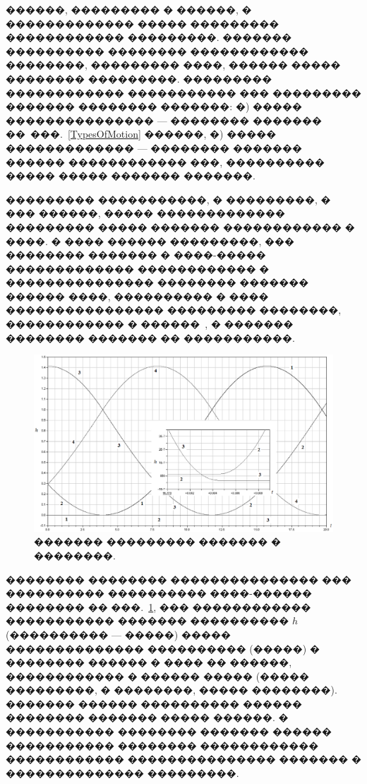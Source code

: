 \documentclass[12pt,a4paper]{article}
\begin{document}
������, ��������� � ������, � ������������� ����� ��������� ������������ 
���������. ������� ���������� �������� ������������ ��������, ��������� ����,
������ ����� �������� ���������. ��������� ������������ ����������� ��� 
��������� ������� �������� �������: �) ����� ��������������� --- �������� 
������� ��~���.~\ref{TypesOfMotion} ������, �) ����� ������������� --- �������� 
������� ������ ������������ ���, ���������� ����� ����� ������� �������. 


��������� �����������, � ���������, � ��� ������, ����� ������������� ��������� 
����� ������� ������������ � ����. � ���� ������ ���������, ��� �������� 
������� � ����-����� ������������� ������������ � ��������������� �������� 
������� ������ ����, ���������� � ���� ���������������� ��������� ��������, 
������������ � ������~\cite{BorisovKilinMamaev}, � ������� �������� ������� �� 
�����������.

\begin{figure}[htb]
\centerline{\includegraphics[width=15cm]{Figure11.eps}}
\caption{������� ��������� ������� � ��������.}
\label{fig1}
\end{figure}

�������� �������� ��������������� ��� ���������� ���������� ����-������ 
�������� �� ���.~\ref{fig1}, ��� ������������ ����������� ������� ���������� 
$h$ (���������� --- �����) ����� �������������� ���������� (�����) � �������� 
������ � ���� �� ������, ������������ � ������ ����� (����� ���������, � 
��������, ����� ��������). ������� ������ ���������� ������ �������� ������� 
����� ������. � ����������� �������� ������� ������ ����������� �������� 
������������ ������������ ��������������� ������� � �������������� ���������.
\end{document}
